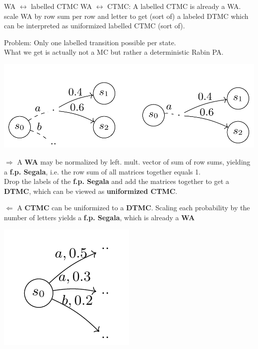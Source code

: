 \documentclass[rgb, pdf]{beamer}
\begin{document}
        \begin{frame}[allowframebreaks]{WA $\leftrightarrow$ labelled CTMC}
        WA $\leftrightarrow$ CTMC: A labelled CTMC is already a WA. \\ scale WA by row sum per row and letter to get (sort of) a labeled DTMC which can be interpreted as uniformized labelled CTMC (sort of).
        \framebreak
        
        Problem: Only one labelled transition possible per state. \\
        
        What we get is actually not a MC but rather a deterministic Rabin PA. \\
        
        \begin{center}
        \includegraphics[keepaspectratio, height=0.4\textheight]{img/lmc_rpa}
        \end{center}    
        
           $\Rightarrow$
         A \textbf{WA} may be normalized by left. mult. vector of sum of row sums, yielding a \textbf{f.p. Segala}, i.e. the row sum of all matrices together equals 1. \\ 
         Drop the labels of the \textbf{f.p. Segala} and add the matrices together to get a \textbf{DTMC}, which can be viewed as \textbf{uniformized CTMC}. \\ \vspace{1.4cm}
         
         $\Leftarrow$
         A \textbf{CTMC} can be uniformized to a \textbf{DTMC}. Scaling each probability by the number of letters yields a \textbf{f.p. Segala}, which is already a \textbf{WA}\\ \vspace{1.4cm}
         
         \includegraphics[keepaspectratio, height=0.4\textheight]{img/fps}
         

\end{frame}
\end{document}
